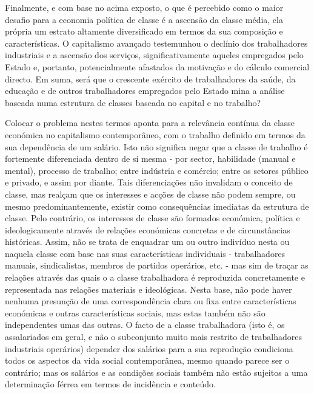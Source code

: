  \par 
Finalmente, e com base no acima exposto, o que é percebido como o maior desafio para a economia política de classe é a ascensão da classe média, ela própria um estrato altamente diversificado em termos da sua composição e características. O capitalismo avançado testemunhou o declínio dos trabalhadores industriais e a ascensão dos serviços, significativamente aqueles empregados pelo Estado e, portanto, potencialmente afastados da motivação e do cálculo comercial directo. Em suma, será que o crescente exército de trabalhadores da saúde, da educação e de outros trabalhadores empregados pelo Estado mina a análise baseada numa estrutura de classes baseada no capital e no trabalho?
 \par 
Colocar o problema nestes termos aponta para a relevância contínua da classe económica no capitalismo contemporâneo, com o trabalho definido em termos da sua dependência de um salário. Isto não significa negar que a classe de trabalho é fortemente diferenciada dentro de si mesma - por sector, habilidade (manual e mental), processo de trabalho; entre indústria e comércio; entre os setores público e privado, e assim por diante. Tais diferenciações não invalidam o conceito de classe, mas realçam que os interesses e acções de classe não podem sempre, ou mesmo predominantemente, existir como consequências imediatas da estrutura de classe. Pelo contrário, os interesses de classe são formados económica, política e ideologicamente através de relações económicas concretas e de circunstâncias históricas. Assim, não se trata de enquadrar um ou outro indivíduo nesta ou naquela classe com base nas suas características individuais - trabalhadores manuais, sindicalistas, membros de partidos operários, etc. - mas sim de traçar as relações através das quais o a classe trabalhadora é reproduzida concretamente e representada nas relações materiais e ideológicas. Nesta base, não pode haver nenhuma presunção de uma correspondência clara ou fixa entre características económicas e outras características sociais, mas estas também não são independentes umas das outras. O facto de a classe trabalhadora (isto é, os assalariados em geral, e não o subconjunto muito mais restrito de trabalhadores industriais operários) depender dos salários para a sua reprodução condiciona todos os aspectos da vida social contemporânea, mesmo quando parece ser o contrário; mas os salários e as condições sociais também não estão sujeitos a uma determinação férrea em termos de incidência e conteúdo.
 \par 
